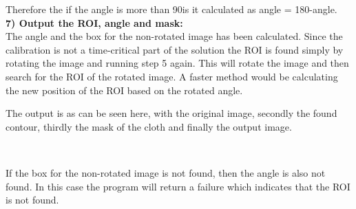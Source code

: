 Therefore the if the angle is more than 90\degree is it calculated as angle = 180\degree-angle.\\

\textbf{7) Output the ROI, angle and mask:}\\
The angle and the box for the non-rotated image has been calculated. Since the calibration is not a time-critical part of the solution the ROI is found simply by rotating the image and running step 5 again.  This will rotate the image and then search for the ROI of the rotated image. A faster method would be calculating the new position of the ROI based on the rotated angle.

The output is as can be seen here, with the original image, secondly the found contour, thirdly the mask of the cloth and finally the output image.

\begin{figure}[H]
\centering
{}
\\
\end{figure}

If the box for the non-rotated image is not found, then the angle is also not found. In this case the program will return a failure which indicates that the ROI is not found.
